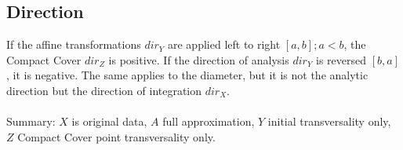 \documentclass{report}
\begin{document}
\subsection*{Direction}
If the affine transformations $dir_{Y}$ are applied left to right $[a,b];a<b$, the Compact Cover $dir_{Z}$ is positive. If the direction of analysis $dir_{Y}$ is reversed $[b,a]$, it is negative. The same applies to the diameter, but it is not the analytic direction but the direction of integration $dir_{X}$.\\\\
Summary: $X$ is original data, $A$ full approximation, $Y$ initial transversality only, $Z$ Compact Cover point transversality only.

\iffalse
\printbibliography
\fi
{}

\end{document}

